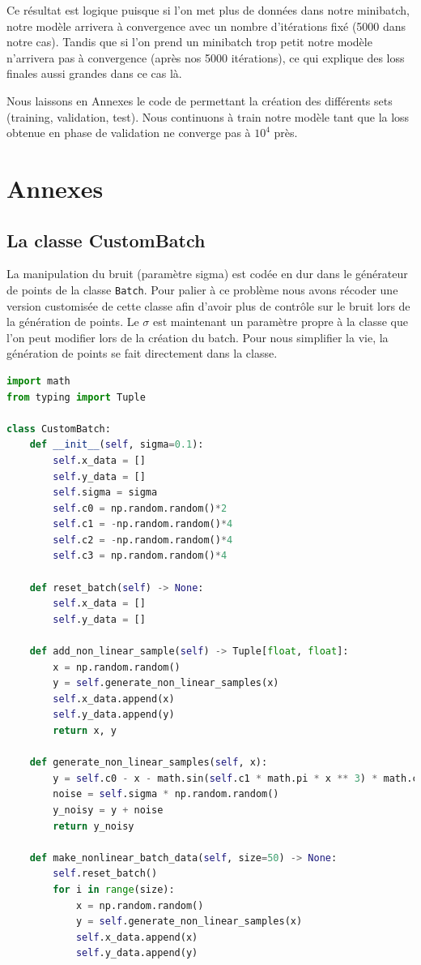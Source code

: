 \documentclass[french,12pt]{article}
\begin{document}
Ce résultat est logique puisque si l'on met plus de données dans notre minibatch, notre modèle arrivera à convergence avec un nombre d'itérations fixé (5000 dans notre cas). Tandis que si l'on prend un minibatch trop petit notre modèle n’arrivera pas à convergence (après nos 5000 itérations), ce qui explique des loss finales aussi grandes dans ce cas là.

\bigskip

Nous laissons en Annexes le code de permettant la création des différents sets (training, validation, test). Nous continuons à train notre modèle tant que la loss obtenue en phase de validation ne converge pas à $10^4$ près.

\newpage
\section{Annexes}

\subsection*{La classe CustomBatch}

La manipulation du bruit (paramètre sigma) est codée en dur dans le générateur de points de la classe \lstinline{Batch}. Pour palier à ce problème nous avons récoder une version customisée de cette classe afin d'avoir plus de contrôle sur le bruit lors de la génération de points. Le $\sigma$ est maintenant un paramètre propre à la classe que l'on peut modifier lors de la création du batch. Pour nous simplifier la vie, la génération de points se fait directement dans la classe.
\bigskip

\begin{lstlisting}[language=Python]
import math
from typing import Tuple

class CustomBatch:
    def __init__(self, sigma=0.1):
        self.x_data = []
        self.y_data = []
        self.sigma = sigma
        self.c0 = np.random.random()*2
        self.c1 = -np.random.random()*4
        self.c2 = -np.random.random()*4
        self.c3 = np.random.random()*4

    def reset_batch(self) -> None:
        self.x_data = []
        self.y_data = []

    def add_non_linear_sample(self) -> Tuple[float, float]:
        x = np.random.random()
        y = self.generate_non_linear_samples(x)
        self.x_data.append(x)
        self.y_data.append(y)
        return x, y

    def generate_non_linear_samples(self, x):
        y = self.c0 - x - math.sin(self.c1 * math.pi * x ** 3) * math.cos(self.c2 * math.pi * x ** 3) * math.exp(-x ** 4)
        noise = self.sigma * np.random.random()
        y_noisy = y + noise
        return y_noisy

    def make_nonlinear_batch_data(self, size=50) -> None:
        self.reset_batch()
        for i in range(size):
            x = np.random.random()
            y = self.generate_non_linear_samples(x)
            self.x_data.append(x)
            self.y_data.append(y)
\end{lstlisting}
\end{document}
